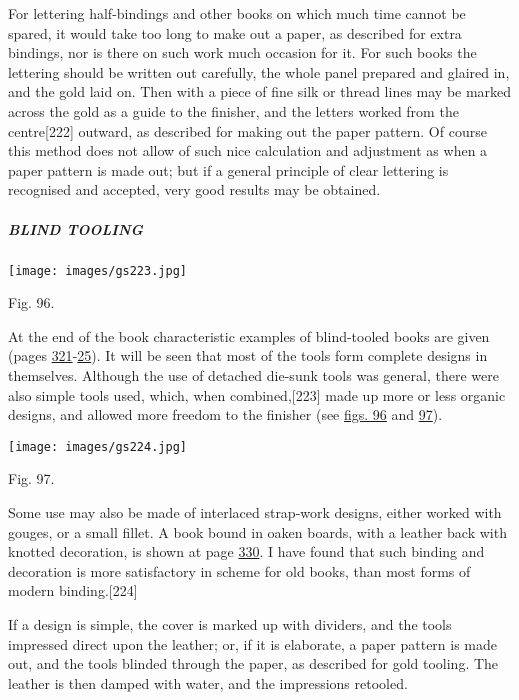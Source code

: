 \documentclass[
]{article}
\begin{document}
For lettering half-bindings and other books on which much time cannot be
spared, it would take too long to make out a paper, as described for
extra bindings, nor is there on such work much occasion for it. For such
books the lettering should be written out carefully, the whole panel
prepared and glaired in, and the gold laid on. Then with a piece of fine
silk or thread lines may be marked across the gold as a guide to the
finisher, and the letters worked from the
centre{\protect\hypertarget{Page_222}{}{{[}222{]}}} outward, as
described for making out the paper pattern. Of course this method does
not allow of such nice calculation and adjustment as when a paper
pattern is made out; but if a general principle of clear lettering is
recognised and accepted, very good results may be obtained.

\hypertarget{blind-tooling}{%
\subparagraph{BLIND TOOLING}\label{blind-tooling}}

\protect\hypertarget{Fig_96}{}{}
\texttt{[image: images/gs223.jpg]}

Fig. 96.

At the end of the book characteristic examples of blind-tooled books are
given (pages
\protect\hyperlink{Page_321}{321}-\protect\hyperlink{Page_325}{25}). It
will be seen that most of the tools form complete designs in themselves.
Although the use of detached die-sunk tools was general, there were also
simple tools used, which, when
combined,{\protect\hypertarget{Page_223}{}{{[}223{]}}} made up more or
less organic designs, and allowed more freedom to the finisher (see
\protect\hyperlink{Fig_96}{figs. 96} and
\protect\hyperlink{Fig_97}{97}).

\protect\hypertarget{Fig_97}{}{}
\texttt{[image: images/gs224.jpg]}

Fig. 97.

Some use may also be made of interlaced strap-work designs, either
worked with gouges, or a small fillet. A book bound in oaken boards,
with a leather back with knotted decoration, is shown at page
\protect\hyperlink{Page_330}{330}. I have found that such binding and
decoration is more satisfactory in scheme for old books, than most forms
of modern binding.{\protect\hypertarget{Page_224}{}{{[}224{]}}}

If a design is simple, the cover is marked up with dividers, and the
tools impressed direct upon the leather; or, if it is elaborate, a paper
pattern is made out, and the tools blinded through the paper, as
described for gold tooling. The leather is then damped with water, and
the impressions retooled.
\end{document}
